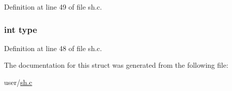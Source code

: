 Definition at line 49 of file sh.\-c.

\hypertarget{structbackcmd_ac765329451135abec74c45e1897abf26}{
\subsubsection[{type}]{\setlength{\rightskip}{0pt plus 5cm}int type}}\label{structbackcmd_ac765329451135abec74c45e1897abf26}


Definition at line 48 of file sh.\-c.



The documentation for this struct was generated from the following file\-:\begin{DoxyCompactItemize}
\item 
user/\hyperlink{sh_8c}{sh.\-c}\end{DoxyCompactItemize}
